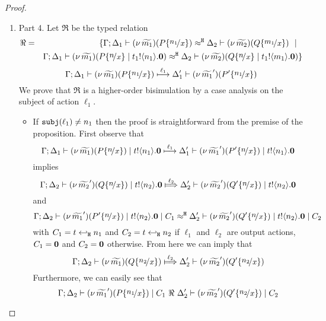 \begin{proof}
\begin{enumerate}[1.]
		\item	Part 4. Let $\Re$ be the typed relation
				\begin{eqnarray*}
					\Re &=& \set{	\horel{\Gamma}{\Delta_1}{ \newsp{\widetilde{m_1}}{P \subst{n_1}{x} }}
									{\hwb}
									{\Delta_2}{ \newsp{\widetilde{m_2}}{Q \subst{m_1}{x} }} \setbar \\
						&&
									\horel{\Gamma}{\Delta_1}{ \newsp{\widetilde{m_1}}{P \subst{n}{x} \Par \bout{t_1}{n_1} \inact }}
									{\hwb}
									{\Delta_2}{ \newsp{\widetilde{m_2}}{Q \subst{n}{x} \Par \bout{t_1}{m_1} \inact }}
					}
				\end{eqnarray*}
				\[
					\horel{\Gamma}{\Delta_1}{\newsp{\widetilde{m_1}}{P \subst{n_1}{x}}}
					{\hby{\ell_1}}
					{\Delta_1'}{\newsp{\widetilde{m_1}'}{P' \subst{n_1}{x}}}
				\]
				We prove that $\Re$ is a higher-order bisimulation by a case analysis on the subject of action $\ell_1$.
				\begin{itemize}
					\item	If $\mathtt{subj}(\ell_1) \not= n_1$ then the proof is straightforward from the premise of the proposition.
							First observe that
							\[
								\horel{\Gamma}{\Delta_1}{\newsp{\widetilde{m_1}}{P \subst{n}{x}} \Par \bout{t}{n_1} \inact}
								{\hby{\ell_1}}
								{\Delta_1'}{\newsp{\widetilde{m_1}'}{P' \subst{n}{x}} \Par \bout{t}{n_1} \inact}
							\]
							implies
							\[
								\horel{\Gamma}{\Delta_2}{\newsp{\widetilde{m_2}'}{Q \subst{n}{x}} \Par \bout{t}{n_2} \inact}
								{\Hby{\ell_2}}
								{\Delta_2'}{\newsp{\widetilde{m_2}'}{Q' \subst{n}{x}} \Par \bout{t}{n_2} \inact}
							\]
							and
							\[
								\horel{\Gamma}{\Delta_2}{\newsp{\widetilde{m_1}'}{P' \subst{n}{x}} \Par \bout{t}{n_2} \inact \Par C_1}
								{\hwb}
								{\Delta_2'}{\newsp{\widetilde{m_2}'}{Q' \subst{n}{x}} \Par \bout{t}{n_2} \inact \Par C_2}
							\]
							with $C_1 = t \hookleftarrow_{\mathtt{H}} n_1$ and $C_2 = t \hookleftarrow_{\mathtt{H}} n_2$ if $\ell_1$ and $\ell_2$ are output actions,
							$C_1 = \mathbf{0}$ and $C_2 = \mathbf{0}$ otherwise.
							From here we can imply that 
							\[
								\horel{\Gamma}{\Delta_2}{\newsp{\widetilde{m_1}}{Q \subst{n_2}{x}}}
								{\Hby{\ell_2}}
								{\Delta_2'}{\newsp{\widetilde{m_2}'}{Q' \subst{n_2}{x}}}
							\]
							Furthermore, we can easily see that
							\[
								\horel{\Gamma}{\Delta_2}{\newsp{\widetilde{m_1}'}{P \subst{n_1}{x}} \Par C_1}
								{\ \Re\ }
								{\Delta_2'}{\newsp{\widetilde{m_2}'}{Q' \subst{n_2}{x}} \Par C_2}
							\]


\end{itemize}
\end{enumerate}
\end{proof}
